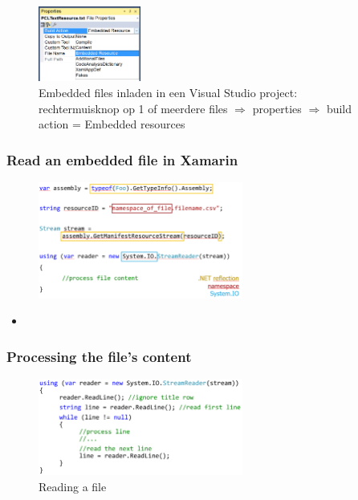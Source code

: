 \documentclass{article}
\begin{document}
\begin{figure}[H]
    \centering
    \includegraphics[width=0.3\textwidth]{embedded-files0.png}
    \caption{Embedded files inladen in een Visual Studio project: rechtermuisknop op 1 of meerdere files $\Rightarrow$ properties $\Rightarrow$ build action = Embedded resources}
\end{figure}

\subsubsection{Read an embedded file in Xamarin}

\begin{figure}[H]
    \centering
    \includegraphics[width=0.6\textwidth]{embedded-files.png}
    \caption{}
\end{figure}

\begin{itemize}
    \item 
\end{itemize}

\subsubsection{Processing the file's content}

\begin{figure}[H]
    \centering
    \includegraphics[width=0.6\textwidth]{embedded-files2.png}
    \caption{Reading a file}
\end{figure}
\end{document}
